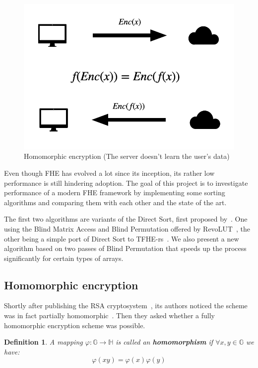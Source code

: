 \documentclass{article}
\newtheorem{definition}{Definition}
\begin{document}
\begin{figure}[h]
    \centering
    \includegraphics[scale=0.35]{fhe}
    \caption{Homomorphic encryption (The server doesn't learn the user's data)}
\end{figure}

Even though FHE has evolved a lot since its inception, its rather low performance is still hindering adoption. The goal of this project is to investigate performance of a modern FHE framework by implementing some sorting algorithms and comparing them with each other and the state of the art.

The first two algorithms are variants of the Direct Sort, first proposed by~\cite{lauter_depth_2015}. One using the Blind Matrix Access and Blind Permutation offered by RevoLUT~\cite{RevoLUT}, the other being a simple port of Direct Sort to TFHE-rs~\cite{TFHE-rs}. We also present a new algorithm based on two passes of Blind Permutation that speeds up the process significantly for certain types of arrays.

\newpage

\subsection{Homomorphic encryption}

Shortly after publishing the RSA cryptosystem~\cite{rivest_method_1978}, its authors noticed the scheme was in fact partially homomorphic~\cite{Rivest1978}. Then they asked whether a fully homomorphic encryption scheme was possible.

\begin{definition}
    A mapping $\varphi : \mathbb{G} \to \mathbb{H}$ is called an \textbf{homomorphism} if $\forall x, y \in \mathbb{G}$ we have:
    \[ \varphi(xy) = \varphi(x)\varphi(y)\]
\end{definition}
\end{document}
